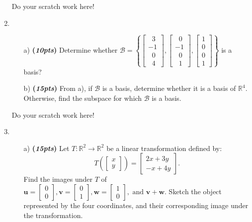\documentclass[12pt]{article}%
\newcommand{\R}{\mathbb{R}}
\begin{document}
\begin{enumerate}
    \newpage
     Do your scratch work here!
     
    \newpage
    
    
    \item 
    \begin{itemize}
        \item[a)]\textbf{(\emph{10pts})} Determine whether   
        \( \mathcal{B} = \left\{
        \begin{bmatrix}\;\;3\\-1\\\;\;0\\\;\;4\end{bmatrix},
       \begin{bmatrix}\;\;0\\-1\\\;\;0\\\;\;1\end{bmatrix},
       \begin{bmatrix}1\\0\\0\\1\end{bmatrix}
       \right\}\)
       is a basis?

       \vspace{8cm}
    
       \item[b)]\textbf{(\emph{15pts})} From a), if \(\mathcal{B}\) is a basis, determine whether it is a basis of  \(\R^4\).
       Otherwise, find the subspace for which \(\mathcal{B}\) is a basis.
    \end{itemize}
    
    \newpage
     Do your scratch work here!
     
    \newpage
    
    \item
    \begin{itemize}
        \item[a)]\textbf{(\emph{15pts})} Let \( T: \mathbb{R}^2 \to \mathbb{R}^2 \) be a linear transformation defined by:
        \[
        T\left(\left[\begin{array}{c} x \\y \end{array}\right]\right) = 
        \left[\begin{array}{c} 2x + 3y\\ -x + 4y \end{array}\right].
        \]
        Find the images under \(T\) of  \(\mathbf{u} = \begin{bmatrix}0\\0\end{bmatrix},
        \mathbf{v}=\begin{bmatrix}0\\1\end{bmatrix}, \mathbf{w}=\begin{bmatrix}1\\0\end{bmatrix}, \text{ and } \mathbf{v} + \mathbf{w}.\)
        Sketch the object represented by the four coordinates, and their corresponding image under the transformation.
        \vspace{12cm}


\end{itemize}
\end{enumerate}
\end{document}
